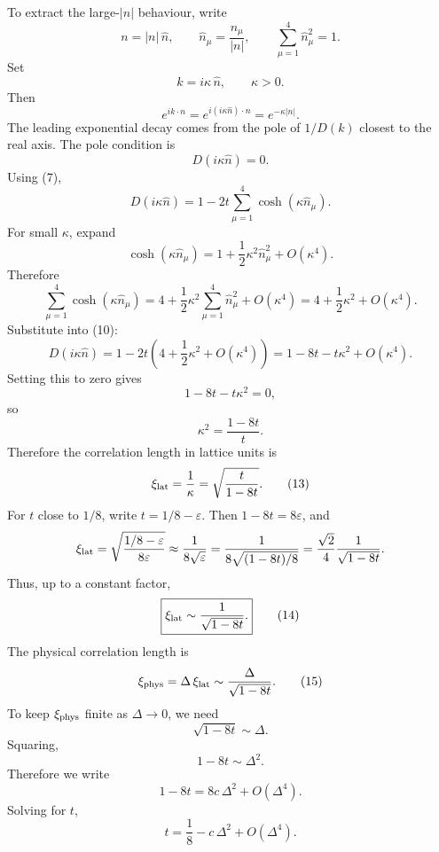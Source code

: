 \documentclass[12pt]{article}
\begin{document}
To extract the large-\(|n|\) behaviour, write
\[
n=|n|\,\hat n,
\qquad
\hat n_\mu=\frac{n_\mu}{|n|},
\qquad
\sum_{\mu=1}^4\hat n_\mu^2=1.
\]
Set
\[
k=i\kappa\,\hat n,
\qquad \kappa>0.
\]
Then
\[
e^{ik\cdot n}=e^{i(i\kappa\hat n)\cdot n}
=e^{-\kappa|n|}.
\]
The leading exponential decay comes from the pole of \(1/D(k)\) closest to the real axis.  
The pole condition is
\[
D(i\kappa\hat n)=0.
\]
Using (7),
\begin{equation}
D(i\kappa\hat n)
=
1-2t\sum_{\mu=1}^4\cosh(\kappa\hat n_\mu).
\tag{10}
\end{equation}
For small \(\kappa\), expand
\[
\cosh(\kappa\hat n_\mu)
=
1+\frac12\kappa^2\hat n_\mu^2+O(\kappa^4).
\]
Therefore
\[
\sum_{\mu=1}^4\cosh(\kappa\hat n_\mu)
=
4+\frac12\kappa^2\sum_{\mu=1}^4\hat n_\mu^2+O(\kappa^4)
=
4+\frac12\kappa^2+O(\kappa^4).
\]
Substitute into (10):
\begin{equation}
D(i\kappa\hat n)
=
1-2t\left(4+\frac12\kappa^2+O(\kappa^4)\right)
=
1-8t-t\kappa^2+O(\kappa^4).
\tag{11}
\end{equation}
Setting this to zero gives
\[
1-8t-t\kappa^2=0,
\]
so
\begin{equation}
\kappa^2=\frac{1-8t}{t}.
\tag{12}
\end{equation}
Therefore the correlation length in lattice units is
\begin{equation}
\xi_{\rm lat}=\frac{1}{\kappa}
=
\sqrt{\frac{t}{1-8t}}.
\tag{13}
\end{equation}
For \(t\) close to \(1/8\), write \(t=1/8-\varepsilon\). Then \(1-8t=8\varepsilon\), and
\[
\xi_{\rm lat}
=
\sqrt{\frac{1/8-\varepsilon}{8\varepsilon}}
\approx
\frac{1}{8\sqrt{\varepsilon}}
=
\frac{1}{8\sqrt{(1-8t)/8}}
=
\frac{\sqrt{2}}{4}\frac{1}{\sqrt{1-8t}}.
\]
Thus, up to a constant factor,
\begin{equation}
\boxed{
\xi_{\rm lat}\sim \frac{1}{\sqrt{1-8t}}.
}
\tag{14}
\end{equation}
The physical correlation length is
\begin{equation}
\xi_{\rm phys}=\Delta\,\xi_{\rm lat}
\sim
\frac{\Delta}{\sqrt{1-8t}}.
\tag{15}
\end{equation}
To keep \(\xi_{\rm phys}\) finite as \(\Delta\to 0\), we need
\[
\sqrt{1-8t}\sim \Delta.
\]
Squaring,
\[
1-8t\sim \Delta^2.
\]
Therefore we write
\begin{equation}
\boxed{
1-8t=8c\,\Delta^2+O(\Delta^4).
}
\tag{16}
\end{equation}
Solving for \(t\),
\begin{equation}
\boxed{
t=\frac18-c\,\Delta^2+O(\Delta^4).
}
\tag{17}
\end{equation}
\end{document}
